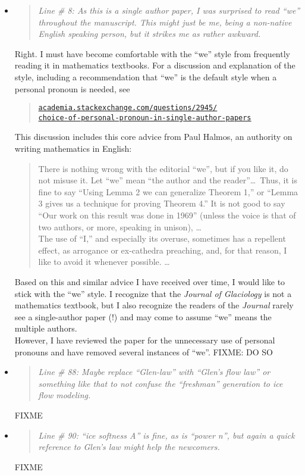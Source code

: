 \documentclass[11pt,reqno]{amsart}
\newcommand{\reply}[2]{
\medskip\medskip
\item  \begin{quote}
\emph{#1}
\end{quote}

\medskip
\noindent #2}
\begin{document}
\begin{itemize}
\reply{Line \# 8: As this is a single author paper, I was surprised to read ``we'' throughout the manuscript. This might just be me, being a non-native English speaking person, but it strikes me as rather awkward.}
{Right.  I must have become comfortable with the ``we'' style from frequently reading it in mathematics textbooks.  For a discussion and explanation of the style, including a recommendation that ``we'' is the default style when a personal pronoun is needed, see\begin{quote}
\href{http://academia.stackexchange.com/questions/2945/choice-of-personal-pronoun-in-single-author-papers}{\texttt{academia.stackexchange.com/questions/2945/\\ \phantom{foobar} choice-of-personal-pronoun-in-single-author-papers}}
\end{quote}
This discussion includes this core advice from Paul Halmos, an authority on writing mathematics in English: \begin{quote} \medskip
There is nothing wrong with the editorial ``we'', but if you like it, do not misuse it.  Let ``we'' mean ``the author and the reader''\dots  \, Thus, it is fine to say ``Using Lemma 2 we can generalize Theorem 1,'' or ``Lemma 3 gives us a technique for proving Theorem 4.''  It is not good to say ``Our work on this result was done in 1969'' (unless the voice is that of two authors, or more, speaking in unison), \dots \medskip \\
\indent The use of ``I,'' and especially its overuse, sometimes has a repellent effect, as arrogance or ex-cathedra preaching, and, for that reason, I like to avoid it whenever possible. \dots \medskip
\end{quote}
Based on this and similar advice I have received over time, I would like to stick with the ``we'' style.  I recognize that the \emph{Journal of Glaciology} is not a mathematics textbook, but I also recognize the readers of the \emph{Journal} rarely see a single-author paper (!) and may come to assume ``we'' means the multiple authors. \medskip \\
\indent However, I have reviewed the paper for the unnecessary use of personal pronouns and have removed several instances of ``we''.  FIXME: DO SO}

\reply{Line \# 88: Maybe replace ``Glen-law'' with ``Glen's flow law'' or something like that to not confuse the ``freshman'' generation to ice flow modeling.}
{FIXME}

\reply{Line \# 90: ``ice softness A'' is fine, as is ``power n'', but again a quick reference to Glen's law might help the newcomers.}
{FIXME}


\end{itemize}
\end{document}
